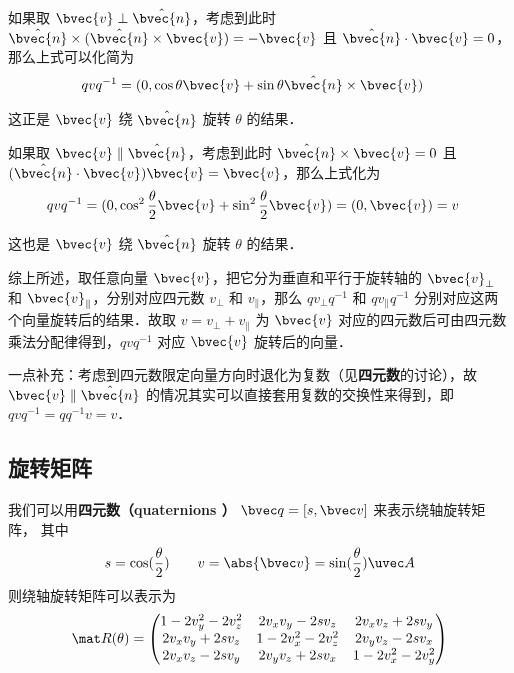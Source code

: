 如果取 $\bvec{v}\perp\hat{\bvec{n}}$，考虑到此时 $\hat{\bvec{n}}\times(\hat{\bvec{n}}\times\bvec{v})=-\bvec{v}$ 且 $\hat{\bvec{n}}\cdot\bvec{v}=0$，那么上式可以化简为
\begin{equation}
\begin{aligned}
qvq^{-1}&=(0, \cos\theta\bvec{v}+\sin\theta\hat{\bvec{n}}\times\bvec{v})
\end{aligned}
\end{equation}

这正是 $\bvec{v}$ 绕 $\hat{\bvec{n}}$ 旋转 $\theta$ 的结果．

如果取 $\bvec{v}\parallel\hat{\bvec{n}}$，考虑到此时 $\hat{\bvec{n}}\times\bvec{v}=0$ 且 $(\hat{\bvec{n}}\cdot\bvec{v})\bvec{v}=\bvec{v}$，那么上式化为
\begin{equation}
\begin{aligned}
qvq^{-1}&=(0, \cos^2\frac{\theta}{2}\bvec{v}+\sin^2\frac{\theta}{2}\bvec{v})=(0, \bvec{v})=v
\end{aligned}
\end{equation}

这也是 $\bvec{v}$ 绕 $\hat{\bvec{n}}$ 旋转 $\theta$ 的结果．

综上所述，取任意向量 $\bvec{v}$，把它分为垂直和平行于旋转轴的 $\bvec{v}_\perp$ 和 $\bvec{v}_\parallel$，分别对应四元数 $v_\perp$ 和 $v_\parallel$，那么 $q v_\perp q^{-1}$ 和 $q v_\parallel q^{-1}$ 分别对应这两个向量旋转后的结果．故取 $v=v_\perp+v_\parallel$ 为 $\bvec{v}$ 对应的四元数后可由四元数乘法分配律得到，$qvq^{-1}$ 对应 $\bvec{v}$ 旋转后的向量．

一点补充：考虑到四元数限定向量方向时退化为复数（见\textbf{四元数}的讨论），故 $\bvec{v}\parallel\hat{\bvec{n}}$ 的情况其实可以直接套用复数的交换性来得到，即 $qvq^{-1}=qq^{-1}v=v$．






\subsection{旋转矩阵}
我们可以用\textbf{四元数（quaternions ）} $\bvec q = [s, \bvec v]$ 来表示绕轴旋转矩阵， 其中
\begin{equation}
s = \cos(\frac{\theta}{2}) \qquad v = \abs{\bvec v} = \sin(\frac{\theta}{2})\uvec A
\end{equation}
则绕轴旋转矩阵可以表示为
\begin{equation}\label{QuatN_eq2}
\mat R(\theta) =
\begin{pmatrix}
1 - 2v_y^2 - 2v_z^2 & 2v_xv_y - 2sv_z  & 2v_x v_z + 2s v_y\\
2v_x v_y + 2sv_z & 1 - 2v_x^2 - 2v_z^2 & 2v_y v_z - 2s v_x\\
2v_x v_z - 2s v_y & 2v_y v_z + 2s v_x & 1 - 2v_x^2 - 2v_y^2
\end{pmatrix}
\end{equation}

